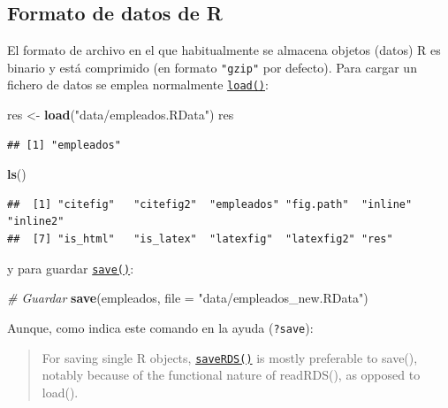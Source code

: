 \documentclass[]{book}
\newenvironment{Shaded}{\begin{snugshade}}{\end{snugshade}}
\newcommand{\KeywordTok}[1]{\textcolor[rgb]{0.13,0.29,0.53}{\textbf{#1}}}
\newcommand{\DataTypeTok}[1]{\textcolor[rgb]{0.13,0.29,0.53}{#1}}
\newcommand{\StringTok}[1]{\textcolor[rgb]{0.31,0.60,0.02}{#1}}
\newcommand{\CommentTok}[1]{\textcolor[rgb]{0.56,0.35,0.01}{\textit{#1}}}
\newcommand{\NormalTok}[1]{#1}
\begin{document}
\subsection{Formato de datos de R}\label{formato-de-datos-de-r}

El formato de archivo en el que habitualmente se almacena objetos
(datos) R es binario y está comprimido (en formato \texttt{"gzip"} por
defecto). Para cargar un fichero de datos se emplea normalmente
\href{https://www.rdocumentation.org/packages/base/versions/3.6.1/topics/load}{\texttt{load()}}:

\begin{Shaded}
\begin{Highlighting}[]
\NormalTok{res <-}\StringTok{ }\KeywordTok{load}\NormalTok{(}\StringTok{"data/empleados.RData"}\NormalTok{)}
\NormalTok{res}
\end{Highlighting}
\end{Shaded}

\begin{verbatim}
## [1] "empleados"
\end{verbatim}

\begin{Shaded}
\begin{Highlighting}[]
\KeywordTok{ls}\NormalTok{()}
\end{Highlighting}
\end{Shaded}

\begin{verbatim}
##  [1] "citefig"   "citefig2"  "empleados" "fig.path"  "inline"    "inline2"  
##  [7] "is_html"   "is_latex"  "latexfig"  "latexfig2" "res"
\end{verbatim}

y para guardar
\href{https://www.rdocumentation.org/packages/base/versions/3.6.1/topics/save}{\texttt{save()}}:

\begin{Shaded}
\begin{Highlighting}[]
\CommentTok{# Guardar}
\KeywordTok{save}\NormalTok{(empleados, }\DataTypeTok{file =} \StringTok{"data/empleados_new.RData"}\NormalTok{)}
\end{Highlighting}
\end{Shaded}

Aunque, como indica este comando en la ayuda (\texttt{?save}):

\begin{quote}
For saving single R objects,
\href{https://www.rdocumentation.org/packages/base/versions/3.6.1/topics/saveRDS}{\texttt{saveRDS()}}
is mostly preferable to save(), notably because of the functional nature
of readRDS(), as opposed to load().
\end{quote}
\end{document}

